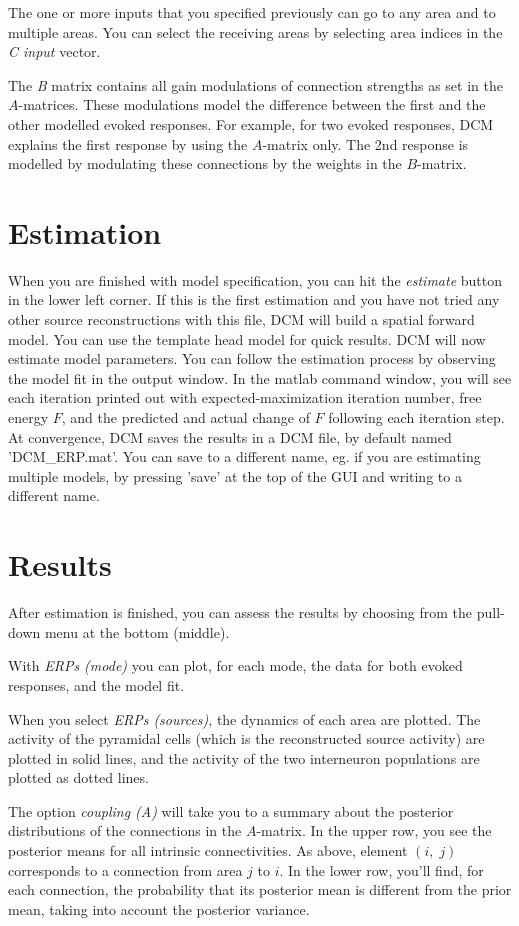 The one or more inputs that you specified previously can go to any area and to multiple areas. You can select
the receiving areas by selecting area indices in the \textit{C input} vector.

The \textit{B} matrix contains all gain modulations of connection
strengths as set in the $A$-matrices. These modulations model the
difference between the first and the other modelled evoked
responses. For example, for two evoked responses, DCM explains the
first response by using the $A$-matrix only. The 2nd response is
modelled by modulating these connections by the weights in
the $B$-matrix.

\section{Estimation}
When you are finished with model specification, you can hit the
\textit{estimate} button in the lower left corner. If this is the
first estimation and you have not tried any other source
reconstructions with this file, DCM will build a spatial forward
model. You can use the template head model for quick results. DCM will now
estimate model parameters. You can follow the estimation process by
observing the model fit in the output window. In the matlab command
window, you will see each iteration printed out with
expected-maximization iteration number, free energy $F$, and the
predicted and actual change of $F$ following each iteration
step. At convergence, DCM saves the results in a DCM file, by default
named 'DCM\_ERP.mat'. You can save to a different name, eg. if you are estimating multiple models, by pressing 'save' at
the top of the GUI and writing to a different name.

\section{Results}
After estimation is finished, you can assess the results
by choosing from the pull-down menu at the bottom (middle).

With \textit{ERPs (mode)} you can plot, for each mode, the data for
both evoked responses, and the model fit.

When you select \textit{ERPs (sources)}, the dynamics of each area are
plotted. The activity of the pyramidal cells (which is the
reconstructed source activity) are plotted in solid
lines, and the activity of the two interneuron populations are plotted
as dotted lines.

The option \textit{coupling (A)} will take you to a summary about the
posterior distributions of the connections in the $A$-matrix. In the
upper row, you see the posterior means for all intrinsic
connectivities. As above, element $(i,\; j)$ corresponds to a
connection from area $j$ to $i$. In the lower row, you'll find, for
each connection, the probability that its posterior mean is different
from the prior mean, taking into account the posterior variance.

